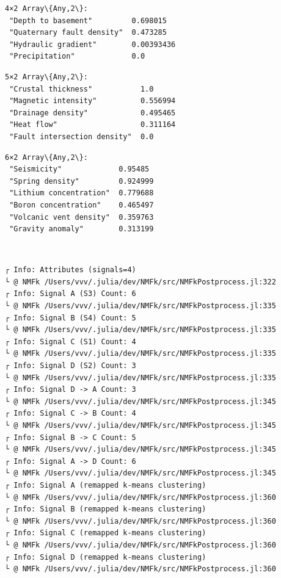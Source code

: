 \documentclass[11pt]{article}
\begin{document}
    
    
    \begin{Verbatim}[commandchars=\\\{\}]
4×2 Array\{Any,2\}:
 "Depth to basement"         0.698015
 "Quaternary fault density"  0.473285
 "Hydraulic gradient"        0.00393436
 "Precipitation"             0.0
    \end{Verbatim}

    
    
    \begin{Verbatim}[commandchars=\\\{\}]
5×2 Array\{Any,2\}:
 "Crustal thickness"           1.0
 "Magnetic intensity"          0.556994
 "Drainage density"            0.495465
 "Heat flow"                   0.311164
 "Fault intersection density"  0.0
    \end{Verbatim}

    
    
    \begin{Verbatim}[commandchars=\\\{\}]
6×2 Array\{Any,2\}:
 "Seismicity"             0.95485
 "Spring density"         0.924999
 "Lithium concentration"  0.779688
 "Boron concentration"    0.465497
 "Volcanic vent density"  0.359763
 "Gravity anomaly"        0.313199
    \end{Verbatim}

    
    \begin{center}
    \end{center}
    { \hspace*{\fill} \\}
    
    \begin{Verbatim}[commandchars=\\\{\}]
┌ Info: Attributes (signals=4)
└ @ NMFk /Users/vvv/.julia/dev/NMFk/src/NMFkPostprocess.jl:322
┌ Info: Signal A (S3) Count: 6
└ @ NMFk /Users/vvv/.julia/dev/NMFk/src/NMFkPostprocess.jl:335
┌ Info: Signal B (S4) Count: 5
└ @ NMFk /Users/vvv/.julia/dev/NMFk/src/NMFkPostprocess.jl:335
┌ Info: Signal C (S1) Count: 4
└ @ NMFk /Users/vvv/.julia/dev/NMFk/src/NMFkPostprocess.jl:335
┌ Info: Signal D (S2) Count: 3
└ @ NMFk /Users/vvv/.julia/dev/NMFk/src/NMFkPostprocess.jl:335
┌ Info: Signal D -> A Count: 3
└ @ NMFk /Users/vvv/.julia/dev/NMFk/src/NMFkPostprocess.jl:345
┌ Info: Signal C -> B Count: 4
└ @ NMFk /Users/vvv/.julia/dev/NMFk/src/NMFkPostprocess.jl:345
┌ Info: Signal B -> C Count: 5
└ @ NMFk /Users/vvv/.julia/dev/NMFk/src/NMFkPostprocess.jl:345
┌ Info: Signal A -> D Count: 6
└ @ NMFk /Users/vvv/.julia/dev/NMFk/src/NMFkPostprocess.jl:345
┌ Info: Signal A (remapped k-means clustering)
└ @ NMFk /Users/vvv/.julia/dev/NMFk/src/NMFkPostprocess.jl:360
┌ Info: Signal B (remapped k-means clustering)
└ @ NMFk /Users/vvv/.julia/dev/NMFk/src/NMFkPostprocess.jl:360
┌ Info: Signal C (remapped k-means clustering)
└ @ NMFk /Users/vvv/.julia/dev/NMFk/src/NMFkPostprocess.jl:360
┌ Info: Signal D (remapped k-means clustering)
└ @ NMFk /Users/vvv/.julia/dev/NMFk/src/NMFkPostprocess.jl:360
    \end{Verbatim}
\end{document}
